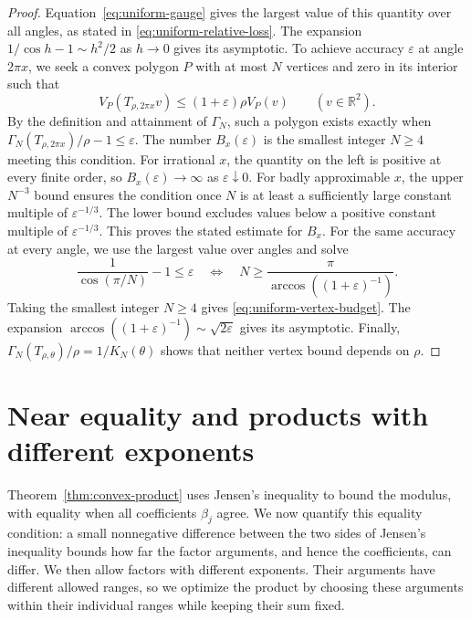 \documentclass[11pt,a4paper]{article}
\theoremstyle{definition}
\theoremstyle{remark}
\numberwithin{equation}{section}
\begin{document}
\begin{proof}
Equation~\eqref{eq:uniform-gauge} gives the largest value of this quantity over all angles, as stated in \eqref{eq:uniform-relative-loss}. The expansion $1/\cos h-1\sim h^2/2$ as $h\to0$ gives its asymptotic.
To achieve accuracy $\varepsilon$ at angle $2\pi x$, we seek a convex polygon $P$ with at most $N$ vertices and zero in its interior such that
\[
 V_P(T_{\rho,2\pi x}v)\le(1+\varepsilon)\rho V_P(v)
 \qquad(v\in\mathbb R^2).
\]
By the definition and attainment of $\Gamma_N$, such a polygon exists exactly when $\Gamma_N(T_{\rho,2\pi x})/\rho-1\le\varepsilon$. The number $B_x(\varepsilon)$ is the smallest integer $N\ge4$ meeting this condition. For irrational $x$, the quantity on the left is positive at every finite order, so $B_x(\varepsilon)\to\infty$ as $\varepsilon\downarrow0$.
For badly approximable $x$, the upper $N^{-3}$ bound ensures the condition once $N$ is at least a sufficiently large constant multiple of $\varepsilon^{-1/3}$. The lower bound excludes values below a positive constant multiple of $\varepsilon^{-1/3}$. This proves the stated estimate for $B_x$.
For the same accuracy at every angle, we use the largest value over angles and solve
\[
 \frac{1}{\cos(\pi/N)}-1\le\varepsilon
 \quad\Longleftrightarrow\quad
 N\ge\frac{\pi}{\arccos((1+\varepsilon)^{-1})}.
\]
Taking the smallest integer $N\ge4$ gives \eqref{eq:uniform-vertex-budget}. The expansion $\arccos((1+\varepsilon)^{-1})\sim\sqrt{2\varepsilon}$ gives its asymptotic. Finally, $\Gamma_N(T_{\rho,\theta})/\rho=1/K_N(\theta)$ shows that neither vertex bound depends on $\rho$.
\end{proof}


\clearpage
\appendix
\section{Near equality and products with different exponents}
\label{app:comparisons}

Theorem~\ref{thm:convex-product} uses Jensen's inequality to bound the modulus, with equality when all coefficients $\beta_j$ agree. We now quantify this equality condition: a small nonnegative difference between the two sides of Jensen's inequality bounds how far the factor arguments, and hence the coefficients, can differ. We then allow factors with different exponents. Their arguments have different allowed ranges, so we optimize the product by choosing these arguments within their individual ranges while keeping their sum fixed.
\end{document}
